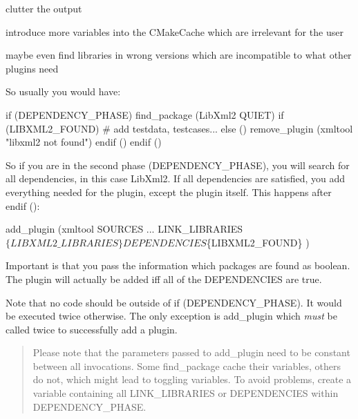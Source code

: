 \begin{DoxyItemize}
\item clutter the output
\item introduce more variables into the {\ttfamily C\+Make\+Cache} which are irrelevant for the user
\item maybe even find libraries in wrong versions which are incompatible to what other plugins need
\end{DoxyItemize}

So usually you would have\+:


\begin{DoxyCode}
if (DEPENDENCY\_PHASE)
        find\_package (LibXml2 QUIET)
        if (LIBXML2\_FOUND)
                # add testdata, testcases...
        else ()
                remove\_plugin (xmltool "libxml2 not found")
        endif ()
endif ()
\end{DoxyCode}


So if you are in the second phase ({\ttfamily D\+E\+P\+E\+N\+D\+E\+N\+C\+Y\+\_\+\+P\+H\+A\+SE}), you will search for all dependencies, in this case {\ttfamily Lib\+Xml2}. If all dependencies are satisfied, you add everything needed for the plugin, except the plugin itself. This happens after {\ttfamily endif ()}\+:


\begin{DoxyCode}
add\_plugin (xmltool
        SOURCES
                ...
        LINK\_LIBRARIES
                $\{LIBXML2\_LIBRARIES\}
        DEPENDENCIES
                $\{LIBXML2\_FOUND\}
        )
\end{DoxyCode}


Important is that you pass the information which packages are found as boolean. The plugin will actually be added iff all of the {\ttfamily D\+E\+P\+E\+N\+D\+E\+N\+C\+I\+ES} are true.

Note that no code should be outside of {\ttfamily if (D\+E\+P\+E\+N\+D\+E\+N\+C\+Y\+\_\+\+P\+H\+A\+SE)}. It would be executed twice otherwise. The only exception is {\ttfamily add\+\_\+plugin} which {\itshape must} be called twice to successfully add a plugin.

\begin{quote}
Please note that the parameters passed to {\ttfamily add\+\_\+plugin} need to be constant between all invocations. Some {\ttfamily find\+\_\+package} cache their variables, others do not, which might lead to toggling variables. To avoid problems, create a variable containing all {\ttfamily L\+I\+N\+K\+\_\+\+L\+I\+B\+R\+A\+R\+I\+ES} or {\ttfamily D\+E\+P\+E\+N\+D\+E\+N\+C\+I\+ES} within {\ttfamily D\+E\+P\+E\+N\+D\+E\+N\+C\+Y\+\_\+\+P\+H\+A\+SE}. \end{quote}



